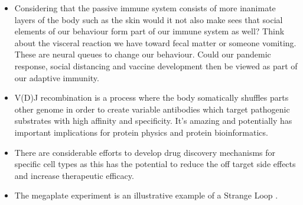 \begin{itemize}
\item Considering that the passive immune system consists of more inanimate layers of the body such as the skin would it not also make sees that social elements of our behaviour form part of our immune system as well? Think about the visceral reaction we have toward fecal matter or someone vomiting. These are neural queues to change our behaviour. Could our pandemic response, social distancing and vaccine development then be viewed as part of our adaptive immunity. 

\item V(D)J recombination is a process where the body somatically shuffles parts other genome in order to create variable antibodies which target pathogenic substrates with high affinity and specificity. It's amazing and potentially has important implications for protein physics and protein bioinformatics.

\item There are considerable efforts to develop drug discovery mechanisms for specific cell types \cite{yu2020} as this has the potential to reduce the off target side effects and increase therapeutic efficacy. 

\item The megaplate experiment\cite{baym2016} is an illustrative example of a Strange Loop \cite{hofstadter2007}. 

\end{itemize}
